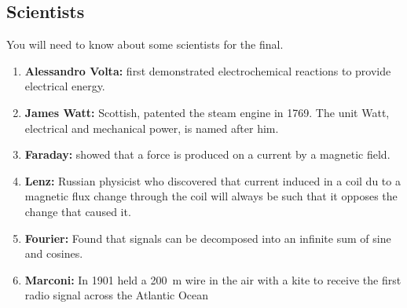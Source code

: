 \subsection*{Scientists}
You will need to know about some scientists for the final.

\begin{enumerate}
  \item \textbf{Alessandro Volta:} first demonstrated electrochemical
  reactions to provide electrical energy.
  \item \textbf{James Watt:} Scottish, patented the steam engine in 1769.
  The unit Watt, electrical and mechanical power, is named after him.
  \item \textbf{Faraday:} showed that a force is produced on a current by a magnetic field.
  \item \textbf{Lenz:} Russian physicist who discovered that current induced
  in a coil du to a magnetic flux change through the coil will always be such
  that it opposes the change that caused it.
  \item \textbf{Fourier:} Found that signals can be decomposed into an infinite sum of sine and cosines.
  \item \textbf{Marconi:} In 1901 held a \SI{200}{m} wire in the air with a
  kite to receive the first radio signal across the Atlantic Ocean
\end{enumerate}